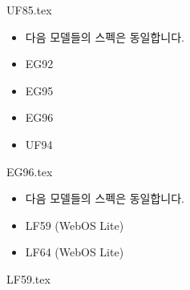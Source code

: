 \documentclass{beamer}
\begin{document}
{UF85.tex}


\begin{frame}[t]{}
\tableofcontents
\huge
\begin{itemize}
\large \item 다음 모델들의 스펙은 동일합니다.
\huge \item EG92
\huge \item EG95
\huge \item EG96
\huge \item UF94
\end{itemize}
\end{frame}

{EG96.tex}


\begin{frame}[t]{}
\tableofcontents
\huge
\begin{itemize}
\large \item 다음 모델들의 스펙은 동일합니다.
\huge \item LF59 (WebOS Lite)
\huge \item LF64 (WebOS Lite)
\end{itemize}
\end{frame}
{LF59.tex}
\end{document}
